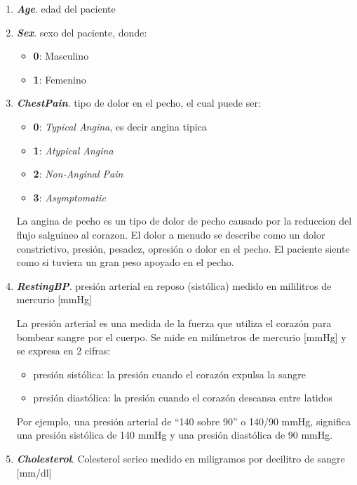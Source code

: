 \documentclass[12pt, letterpaper]{article}
\begin{document}
\begin{enumerate}
    \item{\textbf{\textit{Age}}. edad del paciente} 
    \item{\textbf{\textit{Sex}}. sexo del paciente, donde:
    \begin{itemize}
        \item{\textbf{0}}: Masculino
        \item{\textbf{1}}: Femenino
    \end{itemize}
    }
    \item{\textbf{\textit{ChestPain}}. tipo de dolor en el pecho, el cual puede ser: 
    \begin{itemize}
        \item{\textbf{0}}: \textit{Typical Angina}, es decir angina tipica
        \item{\textbf{1}}: \textit{Atypical Angina}
        \item{\textbf{2}}: \textit{Non-Anginal Pain}
        \item{\textbf{3}}: \textit{Asymptomatic}
    \end{itemize}
    La angina de pecho es un tipo de dolor de pecho causado por la reduccion del flujo
    salguineo al corazon. El dolor a menudo se describe como un dolor constrictivo, 
    presión, pesadez, opresión o dolor en el pecho. El paciente siente como si tuviera
    un gran peso apoyado en el pecho. \cite{angina}
    }
    \item{\textbf{\textit{RestingBP}}. presión arterial en reposo (sistólica)
    medido en mililitros de mercurio [mmHg]
    
    La presión arterial es una medida de la fuerza que utiliza el corazón para bombear
    sangre por el cuerpo. Se mide en milímetros de mercurio [mmHg] y se expresa en 2 cifras:
    \begin{itemize}
        \item{presión sistólica: la presión cuando el corazón expulsa la sangre}
        \item{presión diastólica: la presión cuando el corazón descansa entre latidos}
    \end{itemize}
    Por ejemplo, una presión arterial de \textquotedblleft{}140 sobre 90\textquotedblright{}
    o 140/90 mmHg, significa una presión sistólica de 140 mmHg y una presión diastólica
    de 90 mmHg. \cite{presion-arterial}
    }
    \item{\textbf{\textit{Cholesterol}}. Colesterol serico 
    medido en miligramos por decilitro de sangre [mm/dl]
    
}
\end{enumerate}
\end{document}
